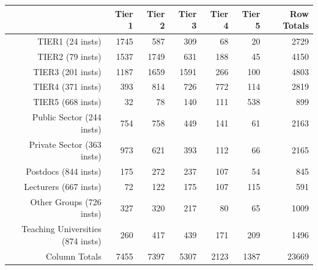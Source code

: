 \begin{tabular}{rrrrrrr}
  \hline
   & \textbf{Tier 1} & \textbf{Tier 2} & \textbf{Tier 3} & \textbf{Tier 4} & \textbf{Tier 5} & \textbf{Row Totals} \\\hline
  TIER1 (24 insts) & 1745 & 587 & 309 & 68 & 20 & 2729 \\
  TIER2 (79 insts) & 1537 & 1749 & 631 & 188 & 45 & 4150 \\
  TIER3 (201 insts) & 1187 & 1659 & 1591 & 266 & 100 & 4803 \\
  TIER4 (371 insts) & 393 & 814 & 726 & 772 & 114 & 2819 \\
  TIER5 (668 insts) & 32 & 78 & 140 & 111 & 538 & 899 \\
  Public Sector (244 insts) & 754 & 758 & 449 & 141 & 61 & 2163 \\
  Private Sector (363 insts) & 973 & 621 & 393 & 112 & 66 & 2165 \\
  Postdocs (844 insts) & 175 & 272 & 237 & 107 & 54 & 845 \\
  Lecturers (667 insts) & 72 & 122 & 175 & 107 & 115 & 591 \\
  Other Groups (726 insts) & 327 & 320 & 217 & 80 & 65 & 1009 \\
  Teaching Universities (874 insts) & 260 & 417 & 439 & 171 & 209 & 1496 \\
  Column Totals & 7455 & 7397 & 5307 & 2123 & 1387 & 23669 \\\hline
\end{tabular}
